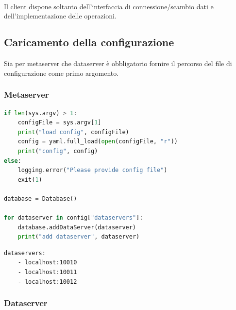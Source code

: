 \documentclass{article}
\begin{document}
\paragraph{} Il client dispone soltanto dell'interfaccia di connessione/scambio dati e dell'implementazione delle operazioni. 

\subsection{Caricamento della configurazione}

\paragraph{} Sia per metaserver che dataserver è obbligatorio fornire il percorso del file di configurazione come primo argomento. 

\subsubsection{Metaserver}

\begin{lstlisting}[language=Python, title=Codice]
if len(sys.argv) > 1:
	configFile = sys.argv[1]
	print("load config", configFile)
	config = yaml.full_load(open(configFile, "r"))
	print("config", config)
else:
	logging.error("Please provide config file")
	exit(1)

database = Database()

for dataserver in config["dataservers"]:
	database.addDataServer(dataserver)
	print("add dataserver", dataserver)
\end{lstlisting}

\begin{lstlisting}[title=Esempio di configurazione]
dataservers:
	- localhost:10010
	- localhost:10011
	- localhost:10012
\end{lstlisting}

\subsubsection{Dataserver}
\end{document}
